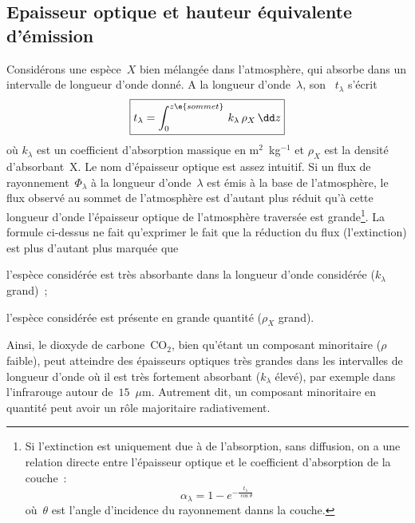 \sk
\subsection{Epaisseur optique et hauteur équivalente d'émission}

\sk
Considérons une espèce~$X$ bien mélangée dans l'atmosphère, qui absorbe dans un intervalle de longueur d'onde donné. A la longueur d'onde~$\lambda$, son ~$t_\lambda$ s'écrit
\[ \boxed{ t_\lambda = \int_{0}^{z\e{sommet}} \, k_\lambda \, \rho_X \, \dd z } \]
où $k_\lambda$ est un coefficient d'absorption massique en m$^2$~kg$^{-1}$ et $\rho_X$ est la densité d'absorbant~X. Le nom d'épaisseur optique est assez intuitif. Si un flux de rayonnement~$\Phi_\lambda$ à la longueur d'onde~$\lambda$ est émis à la base de l'atmosphère, le flux observé au sommet de l'atmosphère est d'autant plus réduit qu'à cette longueur d'onde l'épaisseur optique de l'atmosphère traversée est grande\footnote{Si l'extinction est uniquement due à de l'absorption, sans diffusion, on a une relation directe entre l'épaisseur optique et le coefficient d'absorption de la couche~: 
\[\alpha_\lambda = 1 - e^{- \frac{t_\lambda}{\cos\theta}} \] où~$\theta$ est l'angle d'incidence du rayonnement danns la couche.}. La formule ci-dessus ne fait qu'exprimer le fait que la réduction du flux (l'extinction) est plus d'autant plus marquée que 
\begin{citemize}
\item l'espèce considérée est très absorbante dans la longueur d'onde considérée ($k_\lambda$ grand)~;
\item l'espèce considérée est présente en grande quantité ($\rho_X$ grand).
\end{citemize}
Ainsi, le dioxyde de carbone~CO$_2$, bien qu'étant un composant minoritaire ($\rho$ faible), peut atteindre des épaisseurs optiques très grandes dans les intervalles de longueur d'onde où il est très fortement absorbant ($k_\lambda$ élevé), par exemple dans l'infrarouge autour de~$15$~$\mu$m. Autrement dit, un composant minoritaire en quantité peut avoir un rôle majoritaire radiativement.


